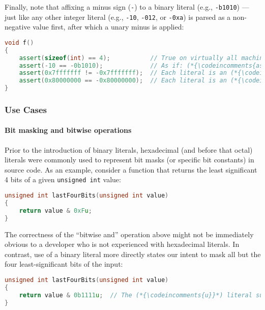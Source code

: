 \documentclass[twoside,10pt,letterpaper,usenames]{newstyle-PearsonGeneric-7-38}
\newcommand{\codeincomments}{\color{skyblue}\ttfamily}
\begin{document}
Finally, note that affixing a minus sign (\texttt{-}) to a binary
literal (e.g., \texttt{-b1010}) --- just like any other integer literal
(e.g., \texttt{-10}, \texttt{-012}, or \texttt{-0xa}) is parsed as a
non-negative value first, after which a unary minus is applied:

\begin{lstlisting}[language=C++]
void f()
{
    assert(sizeof(int) == 4);           // True on virtually all machines today.
    assert(-10 == -0b1010);             // As if: (*{\codeincomments{assert(0 - 10 == 0 - 0b1010);}}*)
    assert(0x7fffffff != -0x7fffffff);  // Each literal is an (*{\codeincomments{signed int}}*).
    assert(0x80000000 == -0x80000000);  // Each literal is an (*{\codeincomments{unsigned int}}*).
}
\end{lstlisting}
    

\subsubsection[Use Cases]{Use Cases}\label{use-cases}

\paragraph[Bit masking and bitwise operations]{Bit masking and bitwise operations}\label{bit-masking-and-bitwise-operations}

Prior to the introduction of binary literals, hexadecimal (and before
that octal) literals were commonly used to represent bit masks (or
specific bit constants) in source code. As an example, consider a
function that returns the least significant 4 bits of a given
\texttt{unsigned}~\texttt{int} value:

\begin{lstlisting}[language=C++]
unsigned int lastFourBits(unsigned int value)
{
    return value & 0xFu;
}
\end{lstlisting}
    

The correctness of the ``bitwise and'' operation above might not be
immediately obvious to a developer who is not experienced with
hexadecimal literals. In contrast, use of a binary literal more directly
states our intent to mask all but the four least-significant bits of the
input:

\begin{lstlisting}[language=C++]
unsigned int lastFourBits(unsigned int value)
{
    return value & 0b1111u;  // The (*{\codeincomments{u}}*) literal suffix here is entirely optional.
}
\end{lstlisting}
    
\end{document}
